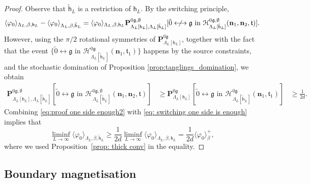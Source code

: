 \documentclass[11pt,a4paper]{article}
\theoremstyle{definition}
\numberwithin{equation}{section}
\newcommand\n{\mathbf{n}}
\newcommand\fg{\mathfrak{g}}
\newcommand\ft{\mathfrak{t}}
\begin{document}
\begin{proof} Observe that $\tilde{\mathsf{h}}_L$ is a restriction of $\mathsf{h}_L$.
By the switching principle,
\begin{equation}\label{eq: switching one side is enough}
     \langle \varphi_0\rangle_{\Lambda_L,\beta,\mathsf{h}_L}- \langle \varphi_0\rangle_{\Lambda_L,\beta,\tilde{\mathsf{h}}_L}= \langle \varphi_0\rangle_{\Lambda_L,\beta, \mathsf{h}_L}\mathbf{P}_{\Lambda_L[\mathsf{h}_L],\Lambda_L[\tilde{\mathsf{h}}_L]}^{0\fg,\emptyset}[\tilde 0 \centernot\longleftrightarrow \fg \text{ in }\mathcal{H}_{\Lambda_L[\tilde{\mathsf{h}}_L]}^{0\fg,\emptyset}(\n_1,\n_2,\ft)].
\end{equation}
However, using the $\pi/2$ rotational symmetries of $\mathbf{P}_{\Lambda_L[\mathsf{h}_L]}^{0\fg}$, together with the fact that the event $\{\tilde{0} \longleftrightarrow \fg \text{ in } \mathcal H^{0\fg}_{\Lambda_L[\tilde{\mathsf{h}}_L]}(\n_1,\ft_1)\}$ happens by the source constraints, and the stochastic domination of Proposition \ref{prop:tanglings_domination}, we obtain
\begin{align}
\mathbf{P}_{\Lambda_L[\mathsf{h}_L],\Lambda_L[\tilde{\mathsf{h}}_L]}^{0\fg,\emptyset}[\tilde 0 \longleftrightarrow \fg \text{ in }\mathcal{H}^{0\fg,\emptyset}_{\Lambda_L[\tilde{\mathsf{h}}_L]}(\n_1,\n_2,\ft)]&\geq \mathbf{P}_{\Lambda_L[\mathsf{h}_L]}^{0\fg}[\tilde 0 \longleftrightarrow \fg \text{ in }\mathcal{H}^{0\fg}_{\Lambda_L[\tilde{\mathsf{h}}_L]}(\n_1,\ft_1)]&\geq \frac{1}{2d}.\label{eq:proof one side enough2}
\end{align}
Combining \eqref{eq:proof one side enough2} with \eqref{eq: switching one side is enough} implies that
\begin{equation}
     \liminf_{L\rightarrow\infty}\langle \varphi_0\rangle_{\Lambda_L,\beta,\tilde{\mathsf{h}}_L}\geq \frac{1}{2d} \liminf_{L\rightarrow\infty}\langle \varphi_0\rangle_{\Lambda_L,\beta, \mathsf{h}_L}=\frac{1}{2d}\langle \varphi_0\rangle^+_\beta,
\end{equation}
where we used Proposition~\ref{prop: thick conv} in the equality.
\end{proof}



\subsection{Boundary magnetisation}
\end{document}
